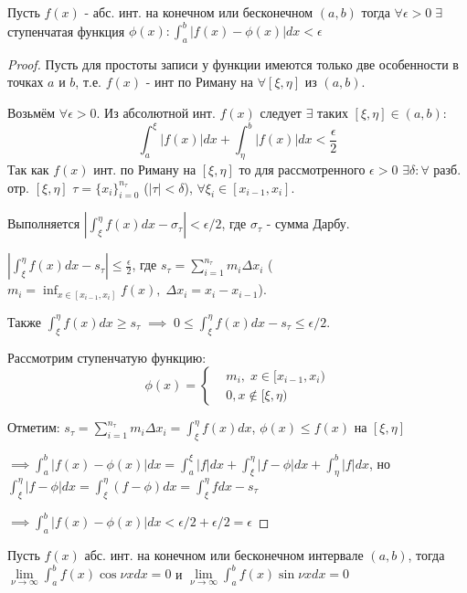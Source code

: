 \documentclass{article}
\begin{document}
\begin{theorem}
  Пусть $f(x)$ - абс. инт. на конечном или бесконечном $(a,b)$ тогда
  $\forall \epsilon >0 \; \exists$ ступенчатая функция $\phi(x):\int_{a}^{b}|f(x)-\phi(x)|dx<\epsilon$
\end{theorem}
\begin{proof}
  Пусть для простоты записи у функции имеются только две особенности в точках $a$ и $b$,
  т.е. $f(x)$ - инт по Риману на $\forall [\xi,\eta]$ из $(a,b)$. 

  Возьмём $\forall \epsilon>0$. Из абсолютной инт. $f(x)$ следует $\exists$ таких
  $[\xi,\eta] \in (a,b)$:
  \[
    \int_{a}^{\xi}|f(x)|dx+\int_{\eta}^{b}|f(x)|dx< \frac{\epsilon}{2}
  \]
  Так как $f(x)$ инт. по Риману на $[\xi,\eta]$ то для рассмотренного $\epsilon>0$ 
  $\exists \delta:\forall$ разб. отр. $[\xi, \eta]$ $\tau=\{x_i\}_{i=0}^{n_\tau}$
  ($|\tau|<\delta$), $\forall \xi_i \in [x_{i-1}, x_i]$.

  Выполняется $\left|\int_{\xi}^{\eta}f(x)dx-\sigma_\tau\right|<\epsilon/2$, где
  $\sigma_\tau$ - сумма Дарбу. 

  $ \left|\int_{\xi}^{\eta}f(x)dx - s_\tau\right|\le \frac{\epsilon}{2}$,
  где $s_\tau=\sum_{i=1}^{n_\tau}m_i\Delta x_i$ ($m_i=\inf_{x \in [x_{i-1},x_i]} f(x), \; \Delta x_i=x_i-x_{i-1}$).

  Также $\int_{\xi}^{\eta}f(x)dx\ge s_\tau \; \implies \; 0 \le \int_{\xi}^{\eta}f(x)dx - s_\tau \le \epsilon/2$.

  Рассмотрим ступенчатую функцию:
  \[
    \phi(x) = \left\{\begin{aligned}
       & m_i, \; x \in [x_{i-1}, x_i) \\ 
       & 0, x \notin [\xi,\eta)
    \end{aligned}\right.
  \]

  Отметим: $s_\tau=\sum_{i=1}^{n_\tau}m_i\Delta x_i=\int_{\xi}^{\eta}f(x)dx$, $\phi(x)\le f(x)$ на $[\xi,\eta]$

  $\implies \int_{a}^{b}|f(x)-\phi(x)|dx=\int_{a}^{\xi}|f|dx+\int_{\xi}^{\eta}|f-\phi|dx+\int_{\eta}^{b}|f|dx$,
  но $\int_{\xi}^{\eta}|f-\phi|dx=\int_{\xi}^{\eta}(f-\phi)dx=\int_{\xi}^{\eta}fdx-s_\tau$

  $\implies \int_{a}^{b}|f(x)-\phi(x)|dx<\epsilon/2+\epsilon/2=\epsilon$
\end{proof}
\begin{theorem} \label{l1_r_osc}
  Пусть $f(x)$ абс. инт. на конечном или бесконечном интервале $(a,b)$,
  тогда $\lim\limits_{\nu\to\infty}\int_{a}^{b}f(x)\cos\nu xdx=0$ и
  $\lim\limits_{\nu\to\infty}\int_{a}^{b}f(x)\sin\nu xdx=0$
\end{theorem}
\end{document}
